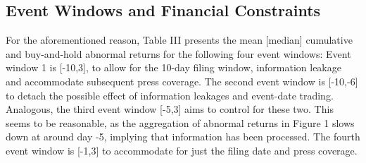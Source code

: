 \documentclass[12pt]{article}
\begin{document}
\subsection{Event Windows and Financial Constraints}

\noindent For the aforementioned reason, Table III presents the mean [median] cumulative and buy-and-hold abnormal returns for the following four event windows: Event window 1 is [-10,3], to allow for the 10-day filing window, information leakage and accommodate subsequent press coverage. The second event window is [-10,-6] to detach the possible effect of information leakages and event-date trading. Analogous, the third event window [-5,3] aims to control for these two. This seems to be reasonable, as the aggregation of abnormal returns in Figure 1 slows down at around day -5, implying that information has been processed. The fourth event window is [-1,3] to accommodate for just the filing date and press coverage.
\end{document}
